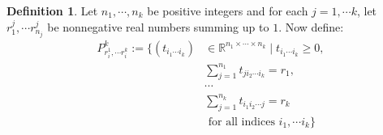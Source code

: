 \documentclass[a4paper]{amsproc}
\theoremstyle{plain}
\theoremstyle{definition}
\newtheorem{definition}[theorem]{Definition}
\theoremstyle{remark}
\numberwithin{equation}{section}
\begin{document}
\begin{definition}
    Let $n_1, \cdots, n_k$ be positive integers and for each $j = 1, \cdots k$, let $r^j_1, \cdots r^j_{n_j}$ be nonnegative real numbers summing up to $1$. Now define:
    \begin{equation*}
        \begin{split}
            P^k_{r_i^1,\cdots r_i^k} := \{ (t_{i_1 \cdots i_k}) &\in \mathbb{R}^{n_1 \times \cdots \times n_k} \mid t_{i_1 \cdots i_k} \geq 0, \\
            & \sum_{j=1}^{n_1} t_{j i_2 \cdots i_k} = r_1, \\
            & \cdots \\
            & \sum_{j=1}^{n_k} t_{i_1 i_2 \cdots j} = r_k \\
            & \text{ for all indices } i_1, \cdots i_k \}
        \end{split}
    \end{equation*}
\end{definition}
\end{document}
